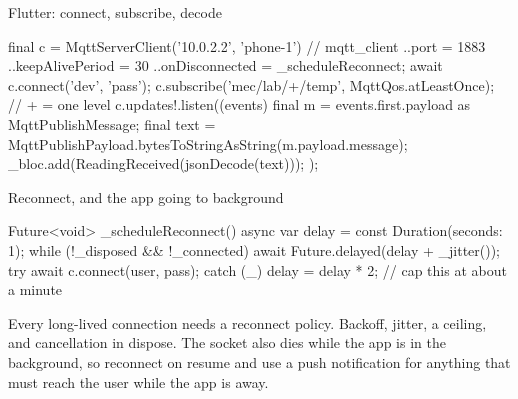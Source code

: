 \documentclass[10pt,aspectratio=169,t]{beamer}
\begin{document}
\begin{frame}[fragile,eyebrow=Both ends]{Flutter: connect, subscribe, decode}
  \vskip 1mm
\begin{dart}
final c = MqttServerClient('10.0.2.2', 'phone-1')  // mqtt_client
  ..port = 1883
  ..keepAlivePeriod = 30
  ..onDisconnected = _scheduleReconnect;
await c.connect('dev', 'pass');
c.subscribe('mec/lab/+/temp', MqttQos.atLeastOnce);  // + = one level
c.updates!.listen((events) {
  final m = events.first.payload as MqttPublishMessage;
  final text = MqttPublishPayload.bytesToStringAsString(m.payload.message);
  _bloc.add(ReadingReceived(jsonDecode(text)));
});
\end{dart}
\end{frame}

\begin{frame}[fragile,eyebrow=Both ends]{Reconnect, and the app going to background}
\begin{dart}
Future<void> _scheduleReconnect() async {
  var delay = const Duration(seconds: 1);
  while (!_disposed && !_connected) {
    await Future.delayed(delay + _jitter());
    try { await c.connect(user, pass); } catch (_) {}
    delay = delay * 2;          // cap this at about a minute
  }
}
\end{dart}
  \begin{takeaway}{Every long-lived connection needs a reconnect policy.}
    Backoff, jitter, a ceiling, and cancellation in dispose. The socket also dies while the app is in the background, so reconnect on resume and use a push notification for anything that must reach the user while the app is away.
  \end{takeaway}
\end{frame}
\end{document}

